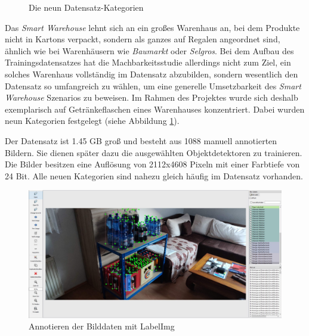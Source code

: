 \begin{figure}[H]
	\hfill
	\hfill
	\caption{Die neun Datensatz-Kategorien}
	\label{categories}
\end{figure}

Das \textit{Smart Warehouse} lehnt sich an ein großes Warenhaus an, bei dem Produkte nicht in Kartons verpackt, sondern als ganzes auf Regalen angeordnet sind, ähnlich wie bei Warenhäusern wie \textit{Baumarkt} oder \textit{Selgros}. Bei dem Aufbau des Trainingsdatensatzes hat die Machbarkeitsstudie allerdings nicht zum Ziel, ein solches Warenhaus vollständig im Datensatz abzubilden, sondern wesentlich den Datensatz so umfangreich zu wählen, um eine generelle Umsetzbarkeit des \textit{Smart Warehouse} Szenarios zu beweisen. Im Rahmen des Projektes wurde sich deshalb exemplarisch auf Getränkeflaschen eines Warenhauses konzentriert. Dabei wurden neun Kategorien festgelegt (siehe Abbildung \ref{categories}). 

Der Datensatz ist 1.45 GB groß und besteht aus 1088 manuell annotierten Bildern. Sie dienen später dazu die ausgewählten Objektdetektoren zu trainieren. Die Bilder besitzen eine Auflösung von 2112x4608 Pixeln mit einer Farbtiefe von 24 Bit. Alle neuen Kategorien sind nahezu gleich häufig im Datensatz vorhanden. 

\begin{figure}[H]
	\begin{center}
		\includegraphics[width=16cm]{Bilder/labelImg.jpeg} 
		\caption[Annotieren der Bilddaten mit labelImg]{Annotieren der Bilddaten mit LabelImg}
		\label{labelImg}
	\end{center}
\end{figure}

